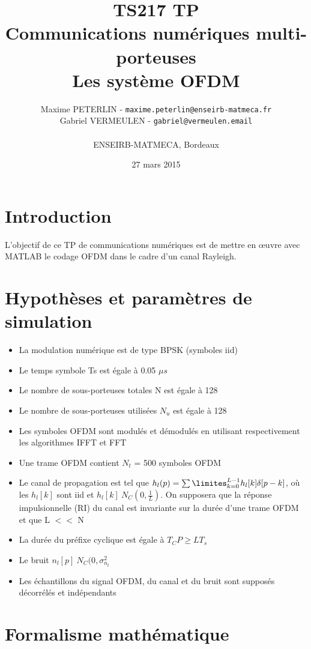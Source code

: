 \documentclass[11pt]{article}
\title{\textbf{TS217 TP}\\Communications numériques multi-porteuses\\Les système OFDM}
\author{Maxime PETERLIN - \texttt{maxime.peterlin@enseirb-matmeca.fr}\\
Gabriel VERMEULEN - \texttt{gabriel@vermeulen.email} \\\\{ENSEIRB-MATMECA, Bordeaux}}
\date{27 mars 2015}
\begin{document}
\maketitle
\tableofcontents

\newpage

\section{Introduction}

L'objectif de ce TP de communications numériques est de mettre en œuvre avec MATLAB le codage OFDM dans le cadre d'un canal Rayleigh.

	\section{Hypothèses et paramètres de simulation}
		
		\begin{itemize}
			\item La modulation numérique est de type BPSK (symboles iid)
			\item Le temps symbole Ts est égale à 0.05 $\mu s$
			\item Le nombre de sous-porteuses totales N est égale à 128
			\item Le nombre de sous-porteuses utilisées $N_u$ est égale à 128
			\item Les symboles OFDM sont modulés et démodulés en utilisant respectivement les algorithmes IFFT et FFT
			\item Une trame OFDM contient $N_t$ = 500 symboles OFDM
			\item Le canal de propagation est tel que $h_l(p) = \sum\limites_{k=0}^{L-1} h_l[k] \delta [p-k]$, où les $h_l[k]$ sont iid et $h_l[k] ~ N_C(0, \frac{1}{L})$. On supposera que la réponse impulsionnelle (RI) du canal est invariante sur la durée d'une trame OFDM et que L $<<$ N
			\item La durée du préfixe cyclique est égale à $T_CP \geq LT_s$
			\item Le bruit $n_l[p] ~ N_C(0, \sigma_{n_l}^2$
			\item Les échantillons du signal OFDM, du canal et du bruit sont supposés décorrélés et indépendants
		\end{itemize}

	\section{Formalisme mathématique}
	
\end{document}
